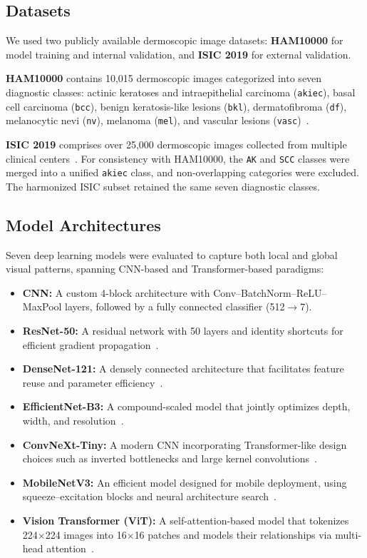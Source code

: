 \documentclass[pdflatex,sn-mathphys-num]{sn-jnl}%
\theoremstyle{thmstyleone}%
\theoremstyle{thmstyletwo}%
\theoremstyle{thmstylethree}%
\begin{document}
\subsection{Datasets}\label{subsec2}

We used two publicly available dermoscopic image datasets: \textbf{HAM10000} for model training and internal validation, and \textbf{ISIC 2019} for external validation.

\textbf{HAM10000} contains 10{,}015 dermoscopic images categorized into seven diagnostic classes: actinic keratoses and intraepithelial carcinoma (\texttt{akiec}), basal cell carcinoma (\texttt{bcc}), benign keratosis-like lesions (\texttt{bkl}), dermatofibroma (\texttt{df}), melanocytic nevi (\texttt{nv}), melanoma (\texttt{mel}), and vascular lesions (\texttt{vasc})~\cite{tschandl2018ham10000}.

\textbf{ISIC 2019} comprises over 25{,}000 dermoscopic images collected from multiple clinical centers~\cite{codella2019skin}. For consistency with HAM10000, the \texttt{AK} and \texttt{SCC} classes were merged into a unified \texttt{akiec} class, and non-overlapping categories were excluded. The harmonized ISIC subset retained the same seven diagnostic classes.

\subsection{Model Architectures}

Seven deep learning models were evaluated to capture both local and global visual patterns, spanning CNN-based and Transformer-based paradigms:

\begin{itemize}
    \item \textbf{CNN:} A custom 4-block architecture with Conv–BatchNorm–ReLU–MaxPool layers, followed by a fully connected classifier (512$\rightarrow$7).
    \item \textbf{ResNet-50:} A residual network with 50 layers and identity shortcuts for efficient gradient propagation~\cite{he2016deep}.
    \item \textbf{DenseNet-121:} A densely connected architecture that facilitates feature reuse and parameter efficiency~\cite{huang2017densely}.
    \item \textbf{EfficientNet-B3:} A compound-scaled model that jointly optimizes depth, width, and resolution~\cite{tan2019efficientnet}.
    \item \textbf{ConvNeXt-Tiny:} A modern CNN incorporating Transformer-like design choices such as inverted bottlenecks and large kernel convolutions~\cite{liu2022convnet}.
    \item \textbf{MobileNetV3:} An efficient model designed for mobile deployment, using squeeze–excitation blocks and neural architecture search~\cite{howard2019searching}.
    \item \textbf{Vision Transformer (ViT):} A self-attention-based model that tokenizes 224$\times$224 images into 16$\times$16 patches and models their relationships via multi-head attention~\cite{dosovitskiy2020image}.
\end{itemize}
\end{document}

